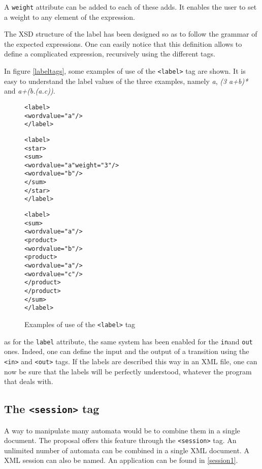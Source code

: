 \documentclass[a4paper]{article}
\newcommand{\xtag}[1]{\texttt{<#1>}}
\newcommand{\xattr}[1]{\texttt{#1}}
\begin{document}
A \xattr{weight} attribute can be added to each of these adds. It enables the
user to set a weight to any element of the expression.

The XSD structure of the label has been designed so as to follow the grammar of
the expected expressions. One can easily notice that this definition allows to
define a complicated expression, recursively using the different tags.

In figure \autoref{labeltags}, some examples of use of the \xtag{label} tag are
shown. It is easy to understand the label values of the three examples, namely
\textit{a}, \textit{(3 a+b)*} and \textit{a+(b.(a.c))}.

\begin{figure}[htp]
  \begin{center}
\begin{alltt}
<label>
  <word value="a"/>
</label>

<label>
  <star>
    <sum>
      <word value="a" weight="3"/>
      <word value="b"/>
    </sum>
  </star>
</label>

<label>
  <sum>
    <word value="a"/>
    <product>
      <word value="b"/>
      <product>
        <word value="a"/>
        <word value="c"/>
      </product>
    </product>
  </sum>
</label>
\end{alltt}

\caption{Examples of use of the \xtag{label} tag}
\label{labeltags}
  \end{center}
\end{figure}

as for the \xattr{label} attribute, the same system has been enabled for the
\xattr{in}and \xattr{out} ones. Indeed, one can define the input and the output
of a transition using the \xtag{in} and \xtag{out} tags.
If the labels are described this way in an XML file, one can now be sure that
the labels will be perfectly understood, whatever the program that deals with.



\subsection{The \xtag{session} tag}

A way to manipulate many automata would be to combine them in a single
document. The proposal offers this feature through the \xtag{session}
tag. An unlimited number of automata can be combined in
a single XML document. A XML session can also be named.  An
application can be found in \autoref{session1}.
\end{document}
